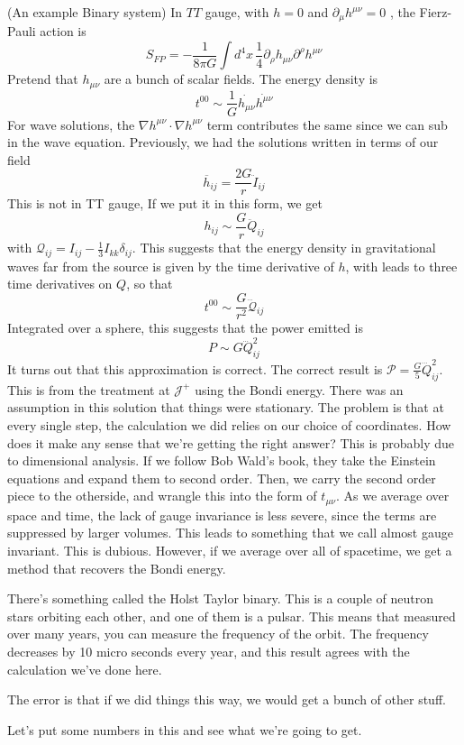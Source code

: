 \begin{example}{(An example Binary system)}
In $ TT $ gauge, with $ h = 0 $ 
and $ \partial  _ \mu h ^{ \mu \nu }  = 0 $ , the Fierz-Pauli 
action is 
\[
 S _{ FP }   = - \frac{1}{8 \pi G } \int d ^ 4 x \, \frac{1}{4 } 
 \partial  _ \rho h _{ \mu \nu } \partial  ^ \rho h ^{ \mu \nu } 
\] Pretend that $ h _{ \mu \nu }$  are a bunch 
of scalar fields. The energy density 
is 
\[
	t ^{ 0 0 } \sim \frac{1}{G } \dot{h _{ \mu \nu } }\dot{h ^{ \mu \nu } }
\]  For wave solutions, 
the $ \nabla h^{ \mu \nu } \cdot  \nabla h ^{ \mu \nu }  $ 
term contributes the same since we can 
sub in the wave equation. 
Previously, we had the solutions
written in terms of our field 
\[
	\overline{ h } _{ ij } = \frac{ 2 G }{ r } \ddot{I}_{ ij }
\]  This is not in TT 
gauge, If we put it in this form, we get 
\[
	h _{ ij } \sim \frac{ G }{ r } \ddot{Q}_{ij }
\] with $ \mathcal{ Q } _{ ij } = I _{ ij }  - \frac{1}{3 } I _{ kk } \delta _{ij } $. This suggests that 
the energy density in gravitational waves 
far from the source is given by 
the time derivative of $ h $, with leads to 
three time derivatives on $ Q $, so that 
\[
	t ^{ 0 0 } \sim \frac{ G }{ r ^ 2 } \dddot{\mathcal{ Q } }_{ ij }
\]  Integrated over a sphere, 
this suggests that the power emitted 
is 
\[
 P \sim  G \dddot{Q}^ 2 _{ ij } 
\] It turns out that this approximation is 
correct. The correct result 
is $ \mathcal{ P }  = \frac{ G }{ 5 }\dddot{Q}^ 2 _{ ij }$. 
This is from the treatment at $ \mathscr{J } ^ + $ 
using the Bondi energy. There was 
an assumption in this solution 
that things were stationary. 
The problem is that at every single step, 
the calculation we did relies on 
our choice of coordinates. 
How does it make any sense that we're getting 
the right answer? This is probably due to dimensional 
analysis. If we follow Bob Wald's book, 
they take the Einstein equations 
and expand them to second order. Then, 
we carry the second order piece to the otherside, 
and wrangle this into the form of $ t _{\mu \nu } $. 
As we average over space and time, 
the lack of gauge invariance is less severe, since 
the terms are suppressed by larger volumes.
This leads to something that we call almost gauge 
invariant. This is dubious. 
However, if we average over all of spacetime, 
we get a method that recovers the Bondi energy. 

There's something called the Holst Taylor binary. 
This is a couple of neutron stars orbiting each other, 
and one of them is a pulsar. 
This means that measured over many years, you 
can measure the frequency of the orbit. 
The frequency decreases by 10 micro seconds every year, 
and this result agrees with the calculation 
we've done here. 

The error is that if we did things this way, 
we would get a bunch of other stuff. 

Let's put some numbers in this and 
see what we're going to get. 
\end{example}

